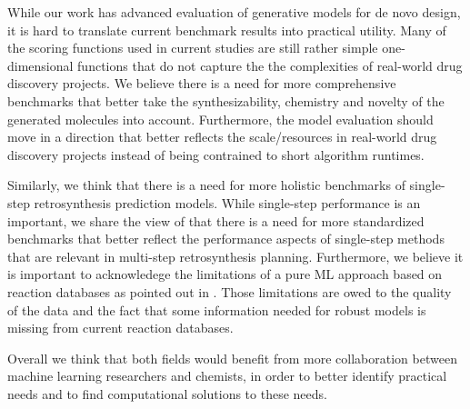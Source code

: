While our work has advanced evaluation of generative models for de novo design, it is hard to
translate current benchmark results into practical utility. Many of the scoring functions used in
current studies are still rather simple one-dimensional functions that do not capture the the
complexities of real-world drug discovery projects. We believe there is a need for more
comprehensive benchmarks that better take the synthesizability, chemistry and novelty of the generated
molecules into account. Furthermore, the model evaluation should move in a direction that better
reflects the scale/resources in real-world drug discovery projects instead of being contrained to
short algorithm runtimes.

Similarly, we think that there is a need for more holistic benchmarks of single-step retrosynthesis
prediction models. While single-step performance is an important, we share the view of
\citet{maziarzReevaluatingRetrosynthesisAlgorithms2024a} that there is a need for more standardized
benchmarks that better reflect the performance aspects of single-step methods that are relevant in
multi-step retrosynthesis planning. Furthermore, we believe it is important to acknowledege the
limitations of a pure ML approach based on reaction databases as pointed out in
\citep{strieth-kalthoffArtificialIntelligenceRetrosynthetic2024}. Those limitations are owed to the
quality of the data and the fact that some information needed for robust models is missing from current
reaction databases.

Overall we think that both fields would benefit from more collaboration between machine learning
researchers and chemists, in order to better identify practical needs and to find
computational solutions to these needs.


